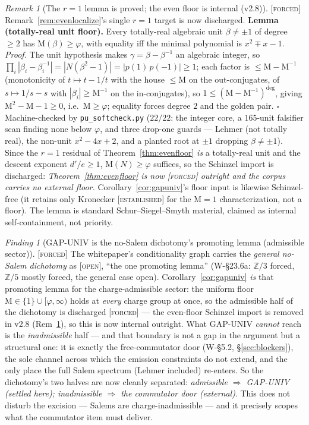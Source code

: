 \documentclass[11pt]{article}
\newcommand{\tagF}{\textcolor{cF}{\textsc{[forced]}}}
\newcommand{\tagE}{\textcolor{cE}{\textsc{[established]}}}
\newcommand{\tagO}{\textcolor{cO}{\textsc{[open]}}}
\newcommand{\Z}{\mathbb{Z}}
\newcommand{\gp}{\varphi}
\newcommand{\M}{\mathrm{M}}
\theoremstyle{plain}
\theoremstyle{definition}
\theoremstyle{remark}
\newtheorem{remark}[theorem]{Remark}
\newtheorem{finding}[theorem]{Finding}
\begin{document}
\begin{remark}[The $r=1$ lemma is proved; the even floor is internal (v2.8)]\label{rem:evenv28}\tagF{}
Remark~\ref{rem:evenlocalize}'s single $r=1$ target is now discharged.
\textbf{Lemma (totally-real unit floor).} Every totally-real algebraic unit
$\beta\ne\pm1$ of degree $\ge2$ has $\M(\beta)\ge\gp$, with equality iff the minimal
polynomial is $x^2\mp x-1$. \emph{Proof.} The unit hypothesis makes
$\gamma=\beta-\beta^{-1}$ an algebraic integer, so
$\prod_i|\beta_i-\beta_i^{-1}|=|N(\beta^2-1)|=|p(1)\,p(-1)|\ge1$; each factor is
$\le\M-\M^{-1}$ (monotonicity of $t\mapsto t-1/t$ with the house $\le\M$ on the
out-conjugates, of $s\mapsto1/s-s$ with $|\beta_i|\ge\M^{-1}$ on the in-conjugates),
so $1\le(\M-\M^{-1})^{\deg}$, giving $\M^2-\M-1\ge0$, i.e.\ $\M\ge\gp$; equality
forces degree $2$ and the golden pair. $\square$ Machine-checked by
\texttt{pu\_softcheck.py} ($22/22$: the integer core, a $165$-unit falsifier scan
finding none below $\gp$, and three drop-one guards --- Lehmer (not totally real),
the non-unit $x^2-4x+2$, and a planted root at $\pm1$ dropping $\beta\ne\pm1$). Since the $r=1$ residual of Theorem~\ref{thm:evenfloor}
\emph{is} a totally-real unit and the descent exponent $d'/e\ge1$, $\M(N)\ge\gp$
suffices, so the Schinzel import is discharged: \emph{Theorem~\ref{thm:evenfloor} is
now \tagF{} outright and the corpus carries \emph{no} external floor.}
Corollary~\ref{cor:gapuniv}'s floor input is likewise Schinzel-free (it retains only
Kronecker \tagE{} for the $\M=1$ characterization, not a floor). The lemma is
standard Schur--Siegel--Smyth material, claimed as internal self-containment, not
priority.
\end{remark}

\begin{finding}[GAP-UNIV is the no-Salem dichotomy's promoting lemma (admissible sector)]\label{find:gapdichotomy}\tagF{}
The whitepaper's conditionality graph carries the \emph{general no-Salem
dichotomy} as \tagO{}, ``the one promoting lemma'' (W-\S23.6a: $\Z/3$ forced,
$\Z/5$ mostly forced, the general case open). Corollary~\ref{cor:gapuniv} \emph{is}
that promoting lemma for the charge-admissible sector: the uniform floor
$\M\in\{1\}\cup[\gp,\infty)$ holds at \emph{every} charge group at once, so the
admissible half of the dichotomy is discharged \tagF{} --- the even-floor Schinzel
import is removed in v2.8 (Rem~\ref{rem:evenv28}), so this is now internal outright. What GAP-UNIV
\emph{cannot} reach is the \emph{inadmissible} half --- and that boundary is not a
gap in the argument but a structural one: it is exactly the free-commutator door
(W-\S5.2, \S\ref{sec:blockers}), the sole channel across which the emission
constraints do not extend, and the only place the full Salem spectrum (Lehmer
included) re-enters. So the dichotomy's two halves are now cleanly separated:
\emph{admissible $\Rightarrow$ GAP-UNIV (settled here); inadmissible $\Rightarrow$
the commutator door (external)}. This does not disturb the excision --- Salems
are charge-inadmissible --- and it precisely scopes what the commutator item must
deliver.
\end{finding}
\end{document}
